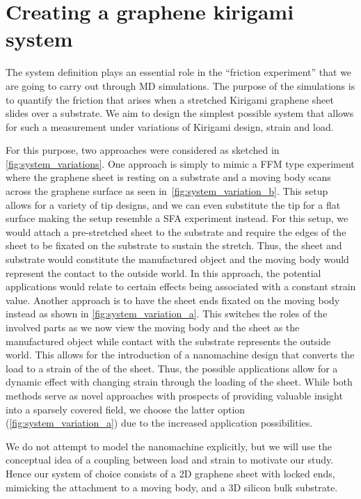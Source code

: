 \chapter{Creating a graphene kirigami system}\label{chap:system}

The system definition plays an essential role in the ``friction experiment''
that we are going to carry out through \acrshort{MD} simulations. The purpose of
the simulations is to quantify the friction that arises when a stretched
Kirigami graphene sheet slides over a substrate. We aim to design the simplest
possible system that allows for such a measurement under variations of Kirigami
design, strain and load.

For this purpose, two approaches were considered as sketched in
\cref{fig:system_variations}. One approach is simply to mimic a \acrshort{FFM}
type experiment where the graphene sheet is resting on a substrate and a moving
body scans across the graphene surface as seen in~\cref{fig:system_variation_b}.
This setup allows for a variety of tip designs, and we can even substitute the
tip for a flat surface making the setup resemble a \acrshort{SFA} experiment
instead. For this setup, we would attach a pre-stretched sheet to the substrate
and require the edges of the sheet to be fixated on the substrate to sustain the
stretch. Thus, the sheet and substrate would constitute the manufactured object
and the moving body would represent the contact to the outside world. In this
approach, the potential applications would relate to certain effects being
associated with a constant strain value. Another approach is to have the sheet
ends fixated on the moving body instead as shown in
\cref{fig:system_variation_a}. This switches the roles of the involved parts as
we now view the moving body and the sheet as the manufactured object
while contact with the substrate represents the outside world. This allows
for the introduction of a nanomachine design that converts the load to a strain of the of the sheet. Thus, the possible applications allow for a dynamic effect
with changing strain through the loading of the sheet. While both methods serve
as novel approaches with prospects of providing valuable insight into a sparsely
covered field, we choose the latter option (\cref{fig:system_variation_a}) due to the increased application possibilities.

We do not attempt to model the nanomachine explicitly, but we will use the
conceptual idea of a coupling between load and strain to motivate our study. Hence our system of choice consists of a 2D graphene sheet with locked ends, mimicking
the attachment to a moving body, and a 3D silicon bulk substrate. 



